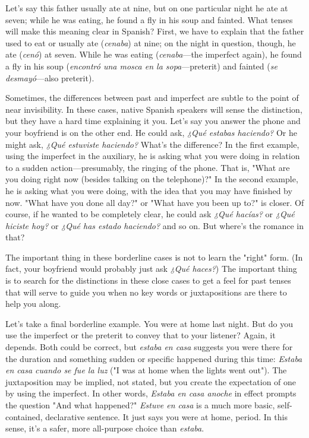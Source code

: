 \documentclass[14pt,a4paper,oneside]{memoir}
\begin{document}
Let's say this father usually ate at nine, but on one particular
night he ate at seven; while he was eating, he found a fly in his soup
and fainted. What tenses will make this meaning clear in Spanish?
First, we have to explain that the father used to eat or usually ate (\emph{cenaba}) at nine; on the night in question, though, he ate (\emph{cenó}) at seven.
While he was eating (\emph{cenaba}---the imperfect again), he found a fly in
his soup (\emph{encontró una mosca en la sopa}---preterit) and fainted (\emph{se desmayó}---also preterit).

Sometimes, the differences between past and imperfect are
subtle to the point of near invisibility. In these cases, native Spanish
speakers will sense the distinction, but they have a hard time explaining it you. Let's say you answer the phone and your boyfriend is on the
other end. He could ask, \emph{¿Qué estabas haciendo?} Or he might ask,
\emph{¿Qué estuviste haciendo?} What's the difference? In the first example,
using the imperfect in the auxiliary, he is asking what you were doing
in relation to a sudden action---presumably, the ringing of the phone.
That is, "What are you doing right now (besides talking on the telephone)?" In the second example, he is asking what you were doing,
with the idea that you may have finished by now. "What have you
done all day?" or "What have you been up to?" is closer. Of course, if
he wanted to be completely clear, he could ask \emph{¿Qué hacías?} or \emph{¿Qué
	hiciste hoy?} or \emph{¿Qué has estado haciendo?} and so on. But where's the
romance in that?

The important thing in these borderline cases is not to learn
the "right" form. (In fact, your boyfriend would probably just ask \emph{¿Qué
	haces?}) The important thing is to search for the distinctions in these
close cases to get a feel for past tenses that will serve to guide you
when no key words or juxtapositions are there to help you along.

Let's take a final borderline example. You were at home last
night. But do you use the imperfect or the preterit to convey that to
your listener? Again, it depends. Both could be correct, but \emph{estaba en
	casa} suggests you were there for the duration and something sudden or
specific happened during this time: \emph{Estaba en casa cuando se fue la
	luz} ("I was at home when the lights went out"). The juxtaposition may
be implied, not stated, but you create the expectation of one by using
the imperfect. In other words, \emph{Estaba en casa anoche} in effect prompts
the question "And what happened?" \emph{Estuve en casa} is a much more
basic, self-contained, declarative sentence. It just says you were at
home, period. In this sense, it's a safer, more all-purpose choice than
\emph{estaba}.
\end{document}
